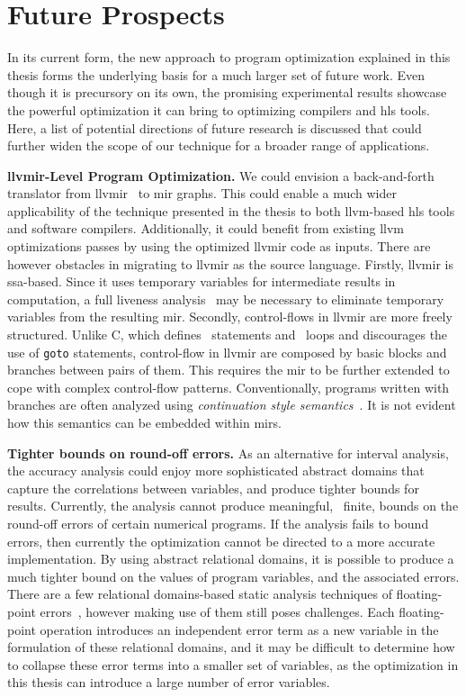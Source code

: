 \section{Future Prospects}
\label{sec:future_prospects}

In its current form, the new approach to program optimization explained in this
thesis forms the underlying basis for a much larger set of future work.  Even
though it is precursory on its own, the promising experimental results showcase
the powerful optimization it can bring to optimizing compilers and \gls{hls}
tools.  Here, a list of potential directions of future research is discussed
that could further widen the scope of our technique for a broader range of
applications.

\textbf{\gls{llvmir}-Level Program Optimization.}  We could envision
a back-and-forth translator from \gls{llvmir}~\cite{llvm, llvm_ir} to
\gls{mir} graphs.  This could enable a much wider applicability of the
technique presented in the thesis to both \gls{llvm}-based \gls{hls} tools
and software compilers.  Additionally, it could benefit from existing
\gls{llvm} optimizations passes by using the optimized \gls{llvmir} code
as inputs.  There are however obstacles in migrating to \gls{llvmir} as
the source language.  Firstly, \gls{llvmir} is \gls{ssa}-based.  Since it
uses temporary variables for intermediate results in computation, a full
liveness analysis~\cite{hathhorn12, nielson99, boissinot08} may be necessary
to eliminate temporary variables from the resulting \gls{mir}\@.  Secondly,
control-flows in \gls{llvmir} are more freely structured.  Unlike C, which
defines \iflit~statements and \whilelit~loops and discourages the use of
\verb|goto| statements, control-flow in \gls{llvmir} are composed by basic
blocks and branches between pairs of them.  This requires the \gls{mir} to be
further extended to cope with complex control-flow patterns.  Conventionally,
programs written with branches are often analyzed using \emph{continuation
style semantics}~\cite{felleisen88}.  It is not evident how this semantics can
be embedded within \glspl{mir}.

\textbf{Tighter bounds on round-off errors.} As an alternative for interval
analysis, the accuracy analysis could enjoy more sophisticated abstract domains
that capture the correlations between variables, and produce tighter bounds
for results.  Currently, the analysis cannot produce meaningful, \ie~finite,
bounds on the round-off errors of certain numerical programs.  If the analysis
fails to bound errors, then currently the optimization cannot be directed
to a more accurate implementation.  By using abstract relational domains,
it is possible to produce a much tighter bound on the values of program
variables, and the associated errors.  There are a few relational domains-based
static analysis techniques of floating-point errors~\cite{mine07_2, putot04,
goubault11, astree}, however making use of them still poses challenges.  Each
floating-point operation introduces an independent error term as a new variable
in the formulation of these relational domains, and it may be difficult to
determine how to collapse these error terms into a smaller set of variables,
as the optimization in this thesis can introduce a large number of error
variables.

